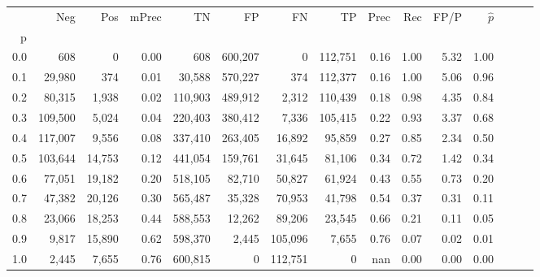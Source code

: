 \begin{tabular}{rrrrrrrrrrrrrrr}
\toprule
{} &      Neg &     Pos & mPrec &       TN &       FP &       FN &       TP &  Prec &   Rec &  FP/P & $\hat{p}$ \\
p   &          &         &       &          &          &          &          &       &       &       &           \\
\midrule
0.0 &      608 &       0 &  0.00 &      608 &  600,207 &        0 &  112,751 &  0.16 &  1.00 &  5.32 &      1.00 \\
0.1 &   29,980 &     374 &  0.01 &   30,588 &  570,227 &      374 &  112,377 &  0.16 &  1.00 &  5.06 &      0.96 \\
0.2 &   80,315 &   1,938 &  0.02 &  110,903 &  489,912 &    2,312 &  110,439 &  0.18 &  0.98 &  4.35 &      0.84 \\
0.3 &  109,500 &   5,024 &  0.04 &  220,403 &  380,412 &    7,336 &  105,415 &  0.22 &  0.93 &  3.37 &      0.68 \\
0.4 &  117,007 &   9,556 &  0.08 &  337,410 &  263,405 &   16,892 &   95,859 &  0.27 &  0.85 &  2.34 &      0.50 \\
0.5 &  103,644 &  14,753 &  0.12 &  441,054 &  159,761 &   31,645 &   81,106 &  0.34 &  0.72 &  1.42 &      0.34 \\
0.6 &   77,051 &  19,182 &  0.20 &  518,105 &   82,710 &   50,827 &   61,924 &  0.43 &  0.55 &  0.73 &      0.20 \\
0.7 &   47,382 &  20,126 &  0.30 &  565,487 &   35,328 &   70,953 &   41,798 &  0.54 &  0.37 &  0.31 &      0.11 \\
0.8 &   23,066 &  18,253 &  0.44 &  588,553 &   12,262 &   89,206 &   23,545 &  0.66 &  0.21 &  0.11 &      0.05 \\
0.9 &    9,817 &  15,890 &  0.62 &  598,370 &    2,445 &  105,096 &    7,655 &  0.76 &  0.07 &  0.02 &      0.01 \\
1.0 &    2,445 &   7,655 &  0.76 &  600,815 &        0 &  112,751 &        0 &   nan &  0.00 &  0.00 &      0.00 \\
\bottomrule
\end{tabular}
